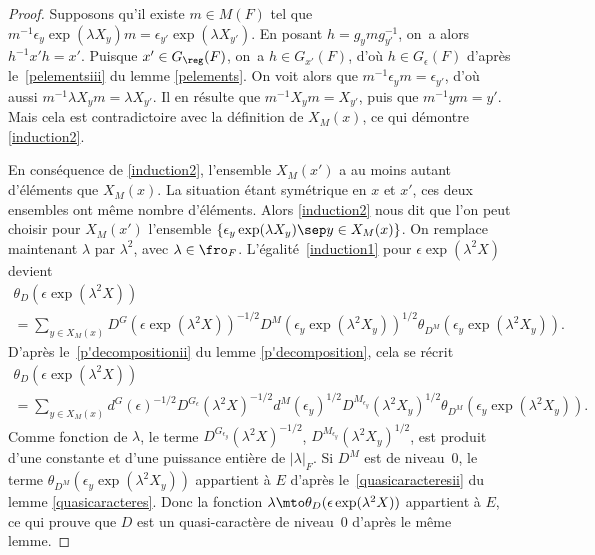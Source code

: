 \begin{proof}
Supposons qu'il existe $m\in M(F)$ tel que $m^{-1}\epsilon_{y}\exp(\lambda X_{y})m=\epsilon_{y'}\exp(\lambda X_{y'})$. En posant $h=g_{y}mg_{y'}^{-1}$, on~a alors $h^{-1}x'h=x'$. Puisque $x'\in G_{\reg}(F)$, on~a $h\in G_{x'}(F)$, d'où $h\in G_{\epsilon}(F)$ d'après le~\eqref{pelementsiii} du lemme \ref{pelements}. On voit alors que $m^{-1}\epsilon_{y}m=\epsilon_{y'}$, d'où aussi $m^{-1}\lambda X_{y}m=\lambda X_{y'}$. Il en résulte que $m^{-1}X_{y}m =X_{y'}$, puis que $m^{-1}ym=y'$. Mais cela est contradictoire avec la définition de $X_{M}(x)$, ce qui démontre \eqref{induction2}.

En conséquence de \eqref{induction2}, l'ensemble $X_{M}(x')$ a au moins autant d'éléments que $X_{M}(x)$. La situation étant symétrique en $x$ et $x'$, ces deux ensembles ont même nombre d'éléments. Alors \eqref{induction2} nous dit que l'on peut choisir pour $X_{M}(x')$ l'ensemble $\{\epsilon_{y}\exp(\lambda X_{y})\sep y\in X_{M}(x)\}$. On remplace maintenant $\lambda$ par $\lambda^2$, avec $\lambda\in \fro_{F}$. L'égalité~\eqref{induction1} pour $\epsilon \exp(\lambda^2X)$ devient\vspace*{-5pt}
\begin{multline*}
\theta_{D}(\epsilon \exp(\lambda^2X))\\[-3pt]
=\sum_{y\in X_{M}(x)}D^G(\epsilon \exp(\lambda^2X))^{-1/2}D^M(\epsilon_{y}\exp(\lambda^2X_{y}))^{1/2}\theta_{D^M}(\epsilon_{y}\exp(\lambda^2X_{y})).
\end{multline*}
D'après le~\eqref{p'decompositionii} du lemme \ref{p'decomposition}, cela se récrit\vspace*{-5pt}
\begin{multline*}
\theta_{D}(\epsilon \exp(\lambda^2X))\\[-3pt]
=\sum_{y\in X_{M}(x)}d^G(\epsilon)^{-1/2}D^{G_{\epsilon}}(\lambda^2X)^{-1/2} d^M(\epsilon_{y})^{1/2}D^{M_{\epsilon_{y}}}(\lambda^2X_{y})^{1/2}\theta_{D^M}(\epsilon_{y}\exp(\lambda^2X_{y})).
\end{multline*}
Comme fonction de $\lambda$, le terme $D^{G_{\epsilon_{y}}}(\lambda^2X)^{-1/2}$, \resp $D^{M_{\epsilon_{y}}}(\lambda^2X_{y})^{1/2}$, est produit d'une constante et d'une puissance entière de $\vert \lambda\vert _{F}$. Si $D^M$ est de niveau~$0$, le terme $ \theta_{D^M}(\epsilon_{y}\exp(\lambda^2X_{y}))$ appartient à $E$ d'après le~\eqref{quasicaracteresii} du lemme \ref{quasicaracteres}. Donc la fonction $\lambda\mto \theta_{D}(\epsilon \exp(\lambda^2X))$ appartient à $E$, ce qui prouve que $D$ est un quasi-caractère de niveau~$0$ d'après le même lemme.
\end{proof}

